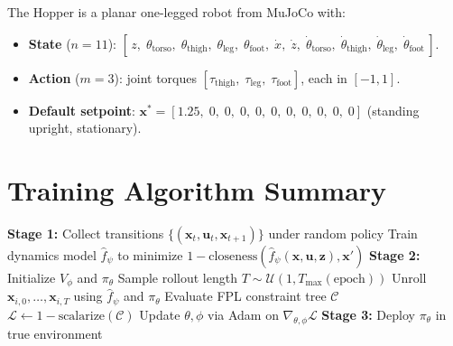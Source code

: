 \documentclass[11pt]{article}
\newcommand{\x}{\bm{x}}
\newcommand{\xstar}{\bm{x}^*}
\newcommand{\uu}{\bm{u}}
\theoremstyle{definition}
\begin{document}
The Hopper is a planar one-legged robot from MuJoCo with:
\begin{itemize}
    \item \textbf{State} ($n = 11$): $[\,z,\; \theta_{\text{torso}},\;
          \theta_{\text{thigh}},\; \theta_{\text{leg}},\; \theta_{\text{foot}},\;
          \dot{x},\; \dot{z},\; \dot{\theta}_{\text{torso}},\;
          \dot{\theta}_{\text{thigh}},\; \dot{\theta}_{\text{leg}},\;
          \dot{\theta}_{\text{foot}}\,]$.

    \item \textbf{Action} ($m = 3$): joint torques
          $[\tau_{\text{thigh}},\; \tau_{\text{leg}},\; \tau_{\text{foot}}]$,
          each in $[-1, 1]$.

    \item \textbf{Default setpoint}: $\xstar = [1.25,\; 0,\; 0,\; 0,\; 0,\;
          0,\; 0,\; 0,\; 0,\; 0,\; 0]$ (standing upright, stationary).
\end{itemize}

\section{Training Algorithm Summary}

\begin{algorithm}[H]
\caption{Hybrid Neural Lyapunov Control}
\begin{algorithmic}[1]
\STATE \textbf{Stage 1:} Collect transitions $\{(\x_t, \uu_t, \x_{t+1})\}$
       under random policy
\STATE Train dynamics model $\hat{f}_\psi$ to minimize
       $1 - \text{closeness}(\hat{f}_\psi(\x, \uu, \bm{z}), \x')$
\STATE \textbf{Stage 2:} Initialize $V_\phi$ and $\pi_\theta$
    \FOR{each batch $\{(\x_i, \xstar_i)\}$}
        \STATE Sample rollout length $T \sim \mathcal{U}(1, T_{\max}(\text{epoch}))$
        \STATE Unroll $\x_{i,0}, \dots, \x_{i,T}$ using $\hat{f}_\psi$ and $\pi_\theta$
        \STATE Evaluate FPL constraint tree $\mathcal{C}$
        \STATE $\mathcal{L} \leftarrow 1 - \text{scalarize}(\mathcal{C})$
        \STATE Update $\theta, \phi$ via Adam on $\nabla_{\theta,\phi} \mathcal{L}$
    \ENDFOR
\ENDFOR
\STATE \textbf{Stage 3:} Deploy $\pi_\theta$ in true environment
\end{algorithmic}
\end{algorithm}
\end{document}
